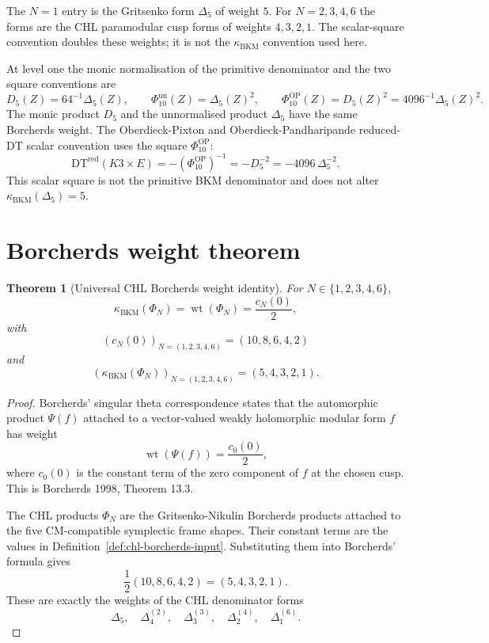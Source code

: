 \documentclass[11pt]{article}
\newtheorem{theorem}{Theorem}[section]
\providecommand{\kBKM}{\kappa_{\mathrm{BKM}}}
\providecommand{\DeltaFive}{\Delta_5}
\providecommand{\Dfive}{D_5}
\providecommand{\PhiOP}{\Phi_{10}^{\mathrm{OP}}}
\providecommand{\Phiun}{\Phi_{10}^{\mathrm{un}}}
\providecommand{\DTred}{\mathrm{DT}^{\mathrm{red}}}
\begin{document}
The $N=1$ entry is the Gritsenko form $\DeltaFive$ of weight $5$.
For $N=2,3,4,6$ the forms are the CHL paramodular cusp forms of
weights $4,3,2,1$. The scalar-square convention doubles these weights;
it is not the $\kBKM$ convention used here.

At level one the monic normalisation of the primitive denominator and
the two square conventions are
\[
  \Dfive(Z)=64^{-1}\DeltaFive(Z),\qquad
  \Phiun(Z)=\DeltaFive(Z)^2,\qquad
  \PhiOP(Z)=\Dfive(Z)^2=4096^{-1}\DeltaFive(Z)^2.
\]
The monic product $\Dfive$ and the unnormalised product $\DeltaFive$
have the same Borcherds weight. The Oberdieck-Pixton and
Oberdieck-Pandharipande reduced-DT scalar convention uses the square
$\PhiOP$:
\[
  \DTred(K3\times E)=-(\PhiOP)^{-1}
  =-\Dfive^{-2}=-4096\,\DeltaFive^{-2}.
\]
This scalar square is not the primitive BKM denominator and does not
alter $\kBKM(\DeltaFive)=5$.

\section{Borcherds weight theorem}
\label{sec:borcherds-weight-theorem}

\begin{theorem}[Universal CHL Borcherds weight identity]
\label{thm:universal-chl-borcherds-weight}
For $N\in\{1,2,3,4,6\}$,
\[
  \kBKM(\Phi_N)=\operatorname{wt}(\Phi_N)=\frac{c_N(0)}{2},
\]
with
\[
  (c_N(0))_{N=(1,2,3,4,6)}=(10,8,6,4,2)
\]
and
\[
  (\kBKM(\Phi_N))_{N=(1,2,3,4,6)}=(5,4,3,2,1).
\]
\end{theorem}

\begin{proof}
Borcherds' singular theta correspondence states that the automorphic
product $\Psi(f)$ attached to a vector-valued weakly holomorphic
modular form $f$ has weight
\[
  \operatorname{wt}(\Psi(f))=\frac{c_0(0)}{2},
\]
where $c_0(0)$ is the constant term of the zero component of $f$ at the
chosen cusp. This is Borcherds 1998, Theorem 13.3.

The CHL products $\Phi_N$ are the Gritsenko-Nikulin Borcherds products
attached to the five CM-compatible symplectic frame shapes. Their
constant terms are the values in Definition~\ref{def:chl-borcherds-input}.
Substituting them into Borcherds' formula gives
\[
  \frac{1}{2}(10,8,6,4,2)=(5,4,3,2,1).
\]
These are exactly the weights of the CHL denominator forms
\[
  \Delta_5,\quad \Delta_4^{(2)},\quad
  \Delta_3^{(3)},\quad \Delta_2^{(4)},\quad
  \Delta_1^{(6)} .
\]
\end{proof}
\end{document}
